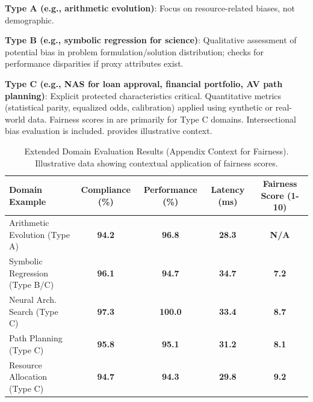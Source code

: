 \documentclass[manuscript,screen,9pt]{acmart}
\newcommand{\tablesize}{\footnotesize}
\newcommand{\tablenumfmt}[1]{\textbf{#1}}
\newcommand{\tableheader}[1]{\textbf{#1}}
\begin{document}
\noindent\textbf{Type A (e.g., arithmetic evolution)}: Focus on resource-related biases, not demographic.

\noindent\textbf{Type B (e.g., symbolic regression for science)}: Qualitative assessment of potential bias in problem formulation/solution distribution; checks for performance disparities if proxy attributes exist.

\noindent\textbf{Type C (e.g., NAS for loan approval, financial portfolio, AV path planning)}: Explicit protected characteristics critical. Quantitative metrics (statistical parity, equalized odds, calibration) applied using synthetic or real-world data.
Fairness scores in  are primarily for Type C domains. Intersectional bias evaluation is included.  provides illustrative context.

\begin{table}[htbp]
\centering
\caption{Extended Domain Evaluation Results (Appendix Context for Fairness). Illustrative data showing contextual application of fairness scores.}
\label{tab:appendix_extended_domain_results_fairness}
\tablesize
\begin{tabular}{@{}lcccc@{}}
\toprule
\tableheader{Domain Example} & \tableheader{Compliance (\%)} & \tableheader{Performance (\%)} & \tableheader{Latency (ms)} & \tableheader{Fairness Score (1-10)} \\
\midrule
Arithmetic Evolution (Type A) & \tablenumfmt{94.2} & \tablenumfmt{96.8} & \tablenumfmt{28.3} & \tablenumfmt{N/A} \\
Symbolic Regression (Type B/C) & \tablenumfmt{96.1} & \tablenumfmt{94.7} & \tablenumfmt{34.7} & \tablenumfmt{7.2} \\
Neural Arch. Search (Type C) & \tablenumfmt{97.3} & \tablenumfmt{100.0} & \tablenumfmt{33.4} & \tablenumfmt{8.7} \\
Path Planning (Type C) & \tablenumfmt{95.8} & \tablenumfmt{95.1} & \tablenumfmt{31.2} & \tablenumfmt{8.1} \\
Resource Allocation (Type C) & \tablenumfmt{94.7} & \tablenumfmt{94.3} & \tablenumfmt{29.8} & \tablenumfmt{9.2} \\
\bottomrule
\end{tabular}
\end{table}
\end{document}
